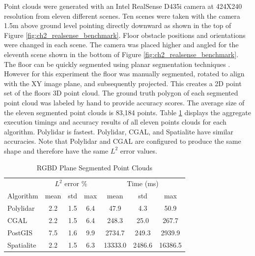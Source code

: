 Point clouds were generated with an Intel RealSense D435i camera at 424X240 resolution from eleven different scenes. Ten scenes were taken with the camera 1.5m above ground level pointing directly downward as shown in the top of Figure \ref{fig:ch2_realsense_benchmark}. Floor obstacle positions and orientations were changed in each scene.  The camera was placed higher and angled for the eleventh scene shown in the bottom of Figure \ref{fig:ch2_realsense_benchmark}. The floor can be quickly segmented using planar segmentation techniques \cite{feng_fast_2014, pham_geometrically_2016-1}. However for this experiment the floor was manually segmented, rotated to align with the XY image plane, and subsequently projected. This creates a 2D point set of the floors 3D point cloud. The ground truth polygon of each segmented point cloud was labeled by hand to provide accuracy scores.  The average size of the eleven segmented point clouds is 83,184 points. Table \ref{table:ch2_rgbd_results} displays the aggregate execution timings and accuracy results of all eleven points clouds for each algorithm. Polylidar is fastest. Polylidar, CGAL, and Spatialite have similar accuracies. Note that Polylidar and CGAL are configured to produce the same shape and therefore have the same $L^2$ error values.


\begin{table}[!ht]
\centering
\caption{RGBD Plane Segmented Point Clouds}
\label{table:ch2_rgbd_results}
\begin{tabular}{lcccccc}
\toprule
{} & \multicolumn{3}{c}{$L^2$ error \%} & \multicolumn{3}{c}{Time (ms)} \\
{Algorithm} &    mean & std &  max &      mean &     std &     max \\
\midrule
Polylidar  &           2.2   &   1.5 &      6.4 & 47.9 & 4.3 & 50.9  \\
CGAL       &           2.2 &    1.5 &      6.4 & 248.3 & 25.0 & 267.7        \\
PostGIS    &           7.5 & 1.6 & 9.9   & 2734.7 & 249.3 & 2939.9     \\
Spatialite &           2.2 & 1.5 & 6.3 &  13333.0 & 2486.6  &   16386.5 \\
\bottomrule
\end{tabular}
\end{table}

